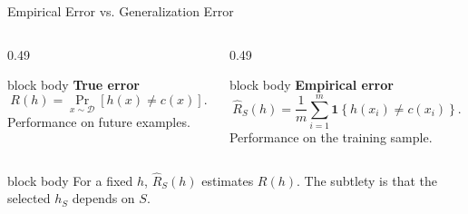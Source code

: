 \documentclass[aspectratio=169,10pt]{beamer}
\newcommand{\D}{\mathcal{D}}
\newcommand{\ind}[1]{\mathbf{1}\!\left\{#1\right\}}
\begin{document}
\begin{frame}[t]{Empirical Error vs. Generalization Error}
  \vspace{0.05cm}
  \begin{columns}[T,totalwidth=\textwidth]
    \begin{column}{0.49\textwidth}
      \begin{beamercolorbox}[rounded=true,sep=0.20cm,wd=\linewidth]{block body}
        \textbf{True error}
        \[
          R(h)=\Pr_{x\sim\D}[h(x)\ne c(x)].
        \]
        Performance on future examples.
      \end{beamercolorbox}
    \end{column}
    \begin{column}{0.49\textwidth}
      \begin{beamercolorbox}[rounded=true,sep=0.20cm,wd=\linewidth]{block body}
        \textbf{Empirical error}
        \[
          \widehat R_S(h)=\frac{1}{m}\sum_{i=1}^{m}\ind{h(x_i)\ne c(x_i)}.
        \]
        Performance on the training sample.
      \end{beamercolorbox}
    \end{column}
  \end{columns}
  \vspace{0.25cm}
  \begin{beamercolorbox}[rounded=true,sep=0.18cm,wd=0.94\linewidth,center]{block body}
    For a fixed $h$, $\widehat R_S(h)$ estimates $R(h)$. The subtlety is that the selected $h_S$ depends on $S$.
  \end{beamercolorbox}
\end{frame}
\end{document}
